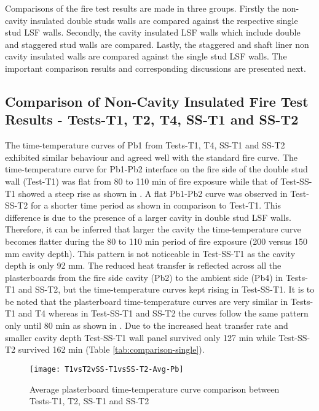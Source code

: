 Comparisons of the fire test results are made in three groups. Firstly the non-cavity insulated double studs walls are compared against the respective single stud LSF walls. Secondly, the cavity insulated LSF walls which include double and staggered stud walls are compared. Lastly, the staggered and shaft liner non cavity insulated walls are compared against the single stud LSF walls. The important comparison results and corresponding discussions are presented next.

\subsection{Comparison of Non-Cavity Insulated Fire Test Results - Tests-T1, T2, T4, SS-T1 and SS-T2}

The time-temperature curves of Pb1 from Tests-T1, T4, SS-T1 and SS-T2 exhibited similar behaviour and agreed well with the standard fire curve. The time-temperature curve for Pb1-Pb2 interface on the fire side of the double stud wall (Test-T1) was flat from 80 to 110 min of fire exposure while that of Test-SS-T1 showed a steep rise as shown in . A flat Pb1-Pb2 curve was observed in Test-SS-T2 for a shorter time period as shown in comparison to Test-T1. This difference is due to the presence of a larger cavity in double stud LSF walls. Therefore, it can be inferred that larger the cavity the time-temperature curve becomes flatter during the 80 to 110 min period of fire exposure (200 versus 150 mm cavity depth). This pattern is not noticeable in Test-SS-T1 as the cavity depth is only 92 mm. The reduced heat transfer is reflected across all the plasterboards from the fire side cavity (Pb2) to the ambient side (Pb4) in Tests-T1 and SS-T2, but the time-temperature curves kept rising in Test-SS-T1. It is to be noted that the plasterboard time-temperature curves are very similar in Tests-T1 and T4 whereas in Test-SS-T1 and SS-T2 the curves follow the same pattern only until 80 min as shown in . Due to the increased heat transfer rate and smaller cavity depth Test-SS-T1 wall panel survived only 127 min while Test-SS-T2 survived 162 min (Table \ref{tab:comparison-single}).
\begin{figure}[!htbp]
	\centering
		\texttt{[image: T1vsT2vSS-T1vsSS-T2-Avg-Pb]}  
	\caption{Average plasterboard time-temperature curve comparison between Tests-T1, T2, SS-T1 and SS-T2}
	\label{fig:T1vsT2vSS-T1vsSS-T2-Avg-Pb}
\end{figure}


